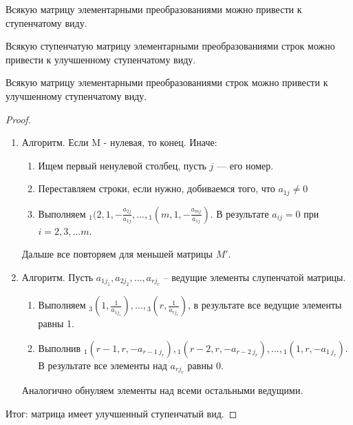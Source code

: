 \begin{theorem}
    \begin{enumerate*}[label=\arabic*)]
    \item Всякую матрицу элементарными преобразованиями можно привести к ступенчатому виду.
    \item Всякую ступенчатую матрицу элементарными преобразованиями строк можно привести к улучшенному ступенчатому виду.
    \end{enumerate*}
\end{theorem}

\begin{consequence}
    Всякую матрицу элементарными преобразованиями строк можно привести к улучшенному ступенчатому виду.
\end{consequence}

\begin{proof}~
    \begin{enumerate}
    \item
        Алгоритм. Если M - нулевая, то конец. Иначе:
        \begin{enumerate}[label=Шаг \arabic*]
        \item Ищем первый ненулевой столбец, пусть $j$ --- его номер.
        \item Переставляем строки, если нужно, добиваемся того, что $a_{1j} \neq 0$
        \item 
            Выполняем $\text{}_1(2, 1, -\frac{a_{2j}}{a_{1j}}, \dots, \text{}_1(m, 1, -\frac{a_{mj}}{a_{1j}})$.
            В результате $a_{ij} = 0$ при $i = 2, 3, \dots m$.
        \end{enumerate}
        Дальше все повторяем для меньшей матрицы $M'$.
    \item 
        Алгоритм. Пусть $a_{1j_1}, a_{2j_2}, \dots, a_{rj_r}$ -- ведущие элементы слупенчатой матрицы.
        \begin{enumerate}[label=Шаг \arabic*]
        \item Выполняем $\text{}_3(1, \frac{1}{a_{1j_1}}), \dots, \text{}_3(r, \frac{1}{a_{rj_r}})$, в результате все ведущие элементы равны 1.
        \item Выполнив $\text{}_1(r - 1, r, -a_{r - 1 \ j_r}), \text{}_1(r - 2, r, -a_{r - 2 \ j_r}), \dots, \text{}_1(1, r, -a_{1 \ j_r})$. В результате все элементы над $a_{r j_r}$ равны 0.
        \end{enumerate}
        Аналогично обнуляем элементы над всеми остальными ведущими.
    \end{enumerate}
    Итог: матрица имеет улучшенный ступенчатый вид.
\end{proof}

